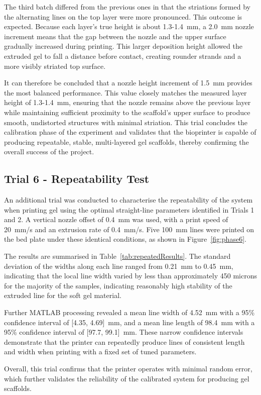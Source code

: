 The third batch differed from the previous ones in that the striations formed by the alternating lines on the top layer were more pronounced. This outcome is expected. Because each layer's true height is about 1.3-1.4~mm, a 2.0~mm nozzle increment means that the gap between the nozzle and the upper surface gradually increased during printing. This larger deposition height allowed the extruded gel to fall a distance before contact, creating rounder strands and a more visibly striated top surface.

It can therefore be concluded that a nozzle height increment of 1.5~mm provides the most balanced performance. This value closely matches the measured layer height of 1.3-1.4~mm, ensuring that the nozzle remains above the previous layer while maintaining sufficient proximity to the scaffold's upper surface to produce smooth, undistorted structures with minimal striation. This trial concludes the calibration phase of the experiment and validates that the bioprinter is capable of producing repeatable, stable, multi-layered gel scaffolds, thereby confirming the overall success of the project.

\subsection*{Trial 6 - Repeatability Test}
An additional trial was conducted to characterise the repeatability of the system when printing gel using the optimal straight-line parameters identified in Trials 1 and 2. A vertical nozzle offset of 0.4~mm was used, with a print speed of 20~mm/s and an extrusion rate of 0.4~mm/s. Five 100~mm lines were printed on the bed plate under these identical conditions, as shown in Figure~\ref{fig:phase6}.

The results are summarised in Table~\ref{tab:repeatedResults}. The standard deviation of the widths along each line ranged from 0.21~mm to 0.45~mm, indicating that the local line width varied by less than approximately 450 microns for the majority of the samples, indicating reasonably high stability of the extruded line for the soft gel material.

Further MATLAB processing revealed a mean line width of 4.52~mm with a 95\% confidence interval of [4.35, 4.69]~mm, and a mean line length of 98.4~mm with a 95\% confidence interval of [97.7, 99.1]~mm. These narrow confidence intervals demonstrate that the printer can repeatedly produce lines of consistent length and width when printing with a fixed set of tuned parameters.

Overall, this trial confirms that the printer operates with minimal random error, which further validates the reliability of the calibrated system for producing gel scaffolds.
